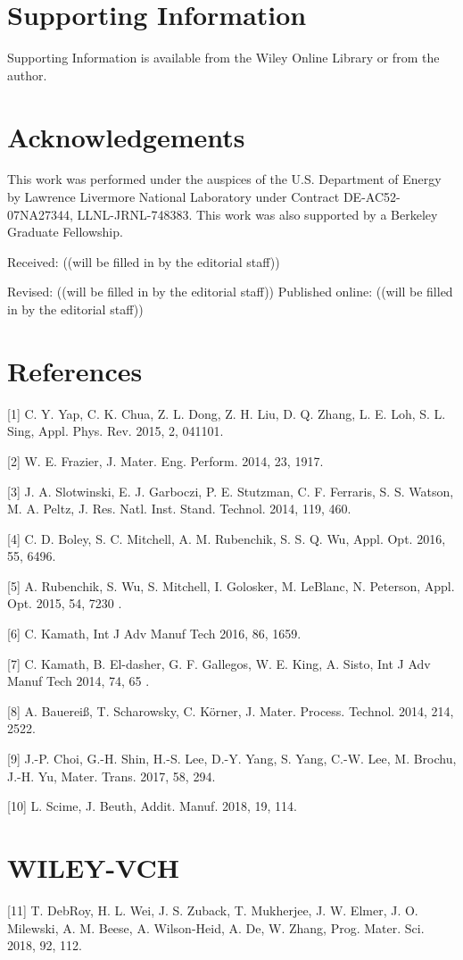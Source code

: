 \documentclass[10pt]{article}
\begin{document}
\section*{Supporting Information}
Supporting Information is available from the Wiley Online Library or from the author.

\section*{Acknowledgements}
This work was performed under the auspices of the U.S. Department of Energy by Lawrence Livermore National Laboratory under Contract DE-AC52-07NA27344, LLNL-JRNL-748383. This work was also supported by a Berkeley Graduate Fellowship.

Received: ((will be filled in by the editorial staff))

Revised: ((will be filled in by the editorial staff)) Published online: ((will be filled in by the editorial staff))

\section*{References}
[1] C. Y. Yap, C. K. Chua, Z. L. Dong, Z. H. Liu, D. Q. Zhang, L. E. Loh, S. L. Sing, Appl. Phys. Rev. 2015, 2, 041101.

[2] W. E. Frazier, J. Mater. Eng. Perform. 2014, 23, 1917.

[3] J. A. Slotwinski, E. J. Garboczi, P. E. Stutzman, C. F. Ferraris, S. S. Watson, M. A. Peltz, J. Res. Natl. Inst. Stand. Technol. 2014, 119, 460.

[4] C. D. Boley, S. C. Mitchell, A. M. Rubenchik, S. S. Q. Wu, Appl. Opt. 2016, 55, 6496.

[5] A. Rubenchik, S. Wu, S. Mitchell, I. Golosker, M. LeBlanc, N. Peterson, Appl. Opt. 2015, 54, 7230 .

[6] C. Kamath, Int J Adv Manuf Tech 2016, 86, 1659.

[7] C. Kamath, B. El-dasher, G. F. Gallegos, W. E. King, A. Sisto, Int J Adv Manuf Tech 2014, 74, 65 .

[8] A. Bauereiß, T. Scharowsky, C. Körner, J. Mater. Process. Technol. 2014, 214, 2522.

[9] J.-P. Choi, G.-H. Shin, H.-S. Lee, D.-Y. Yang, S. Yang, C.-W. Lee, M. Brochu, J.-H. Yu, Mater. Trans. 2017, 58, 294.

[10] L. Scime, J. Beuth, Addit. Manuf. 2018, 19, 114.

\section*{WILEY-VCH}
[11] T. DebRoy, H. L. Wei, J. S. Zuback, T. Mukherjee, J. W. Elmer, J. O. Milewski, A. M. Beese, A. Wilson-Heid, A. De, W. Zhang, Prog. Mater. Sci. 2018, 92, 112.
\end{document}
